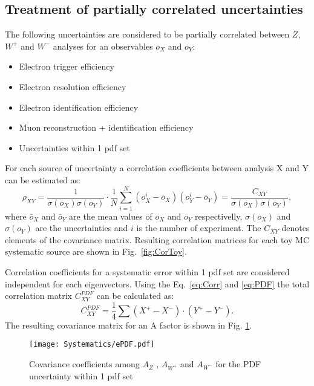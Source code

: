 \subsection{Treatment of partially correlated uncertainties}\label{sec:partCor}

The following uncertainties are considered to be partially correlated between $Z$, $W^{+}$ and $W^{-}$ analyses for an observables $o_X$ and $o_Y$:
\begin{itemize}
\item Electron trigger efficiency
\item Electron resolution efficiency
\item Electron identification efficiency
\item Muon reconstruction + identification efficiency
\item Uncertainties within 1 pdf set
\end{itemize}

For each source of uncertainty a correlation coefficients between analysis X and Y can be estimated as:
\begin{equation}\label{eq:Corr}
\rho_{XY}=\frac{1}{\sigma(o_X)\sigma(o_Y)}\cdot \frac{1}{N} \sum_{i=1}^N (o^i_X-\bar{o}_X) (o^i_Y-\bar{o}_Y)=\frac{C_{XY}}{\sigma(o_X)\sigma(o_Y)},
\end{equation}
where $\bar{o}_X$ and $\bar{o}_Y$ are the mean values of $o_X$ and $o_Y$ respectivelly,  $\sigma(o_X)$ and $\sigma(o_Y)$ are the uncertainties and $i$ is the number of experiment.  The $C_{XY}$ denotes elements of the covariance matrix. Resulting correlation matrices for each toy MC systematic source are shown in Fig.~\ref{fig:CorToy}.



Correlation coefficients for a systematic error within 1 pdf set are considered independent for each eigenvectors. Using the Eq.~\ref{eq:Corr} and \ref{eq:PDF} the total correlation matrix $C^{PDF}_{XY}$ can be calculated as:
\begin{equation}
C^{PDF}_{XY}= \frac{1}{4}\sum(X^{+}-X^{-})\cdot (Y^{+}-Y^{-}).
\end{equation}
The resulting covariance matrix for an A factor is shown in Fig. \ref{fig:ApdfErr}.

\begin{figure}[!tb]
\begin{center}
\begin{minipage}[h]{0.49\linewidth}
\texttt{[image: Systematics/ePDF.pdf]}
\end{minipage}
\caption{Covariance coefficients among $A_{Z}$ , $A_{W^{+}}$ and $A_{W^{-}}$ for the PDF uncertainty within 1 pdf set}
\label{fig:ApdfErr}
\end{center}
\end{figure}


